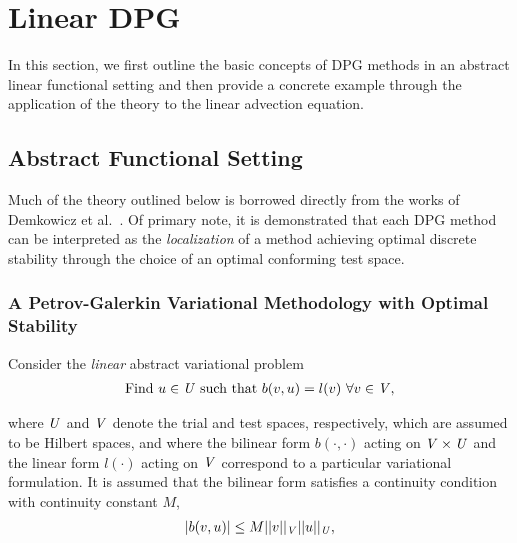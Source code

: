 
\section{Linear DPG} \label{sec:dpg_linear}

In this section, we first outline the basic concepts of DPG methods in an abstract linear functional setting and then
provide a concrete example through the application of the theory to the linear advection equation.

\subsection{Abstract Functional Setting}

Much of the theory outlined below is borrowed directly from the works of Demkowicz et
al.~\cite{Demkowicz2014_overview,Demkowicz2017}. Of primary note, it is demonstrated that each DPG method can be
interpreted as the \emph{localization} of a method achieving optimal discrete stability through the choice of an
optimal conforming test space.

\subsubsection{A Petrov-Galerkin Variational Methodology with Optimal Stability} \label{sec:PG_aspect_of_DPG}

Consider the \emph{linear} abstract variational problem
\begin{align} \label{eq:bilinear_abstract_infinite}
\text{Find}\ u \in \mathit{{{U}}}\ \text{such that}\
b(v,u) = l(v)\ \forall v \in \mathit{{{V}}},
\end{align}

where $\mathit{{{U}}}$ and $\mathit{{{V}}}$ denote the trial and test spaces, respectively, which are assumed to be Hilbert
spaces, and where the bilinear form $b(\cdot,\cdot)$ acting on $\mathit{{{V}}} \times \mathit{{{U}}}$ and the linear form
$l(\cdot)$ acting on $\mathit{{{V}}}$ correspond to a particular variational formulation. It is assumed that the bilinear form
satisfies a continuity condition with continuity constant $M$,
\begin{align}
| b(v,u) | \le M
||v||_{\mathit{{{V}}}}
||u||_{\mathit{{{U}}}},
\end{align}

